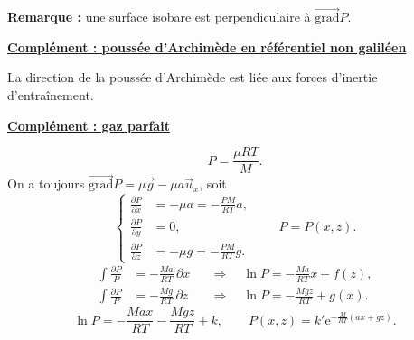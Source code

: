 \documentclass[11pt,a4paper]{article}
\newcommand{\grad}{\overrightarrow{\mathrm{grad}}}
\newcommand{\pd}[2]{\frac{\partial #1}{\partial #2}}
\newcommand{\ux}{\vec u_x}\newcommand{\uy}{\vec u_y}\newcommand{\uz}{\vec u_z}
\newcommand{\titr}[1]{\par\needspace{4\baselineskip}\textbf{\underline{#1}}\par}
\begin{document}
\textbf{Remarque :} une surface isobare est perpendiculaire à $\grad P$.
\titr{Complément : poussée d'Archimède en référentiel non galiléen}
\begin{minipage}{.35\linewidth}\centering{}\end{minipage}\hfill\begin{minipage}{.62\linewidth}
La direction de la poussée d'Archimède est liée aux forces d'inertie d'entraînement.
\end{minipage}
\titr{Complément : gaz parfait}
\[P=\frac{\mu RT}{M}.\]
On a toujours $\grad P=\mu\vec g-\mu a\ux$, soit
\[\left\{\begin{aligned}
\pd P x&=-\mu a=-\frac{PM}{RT}a,\\
\pd P y&=0,\\
\pd P z&=-\mu g=-\frac{PM}{RT}g.
\end{aligned}\right.\qquad P=P(x,z).\]
\[\begin{aligned}
\int\frac{\partial P}{P}&=-\frac{Ma}{RT}\,\partial x
&&\Longrightarrow\quad\ln P=-\frac{Ma}{RT}x+f(z),\\
\int\frac{\partial P}{P}&=-\frac{Mg}{RT}\,\partial z
&&\Longrightarrow\quad\ln P=-\frac{Mgz}{RT}+g(x).
\end{aligned}\]
\[\ln P=-\frac{Max}{RT}-\frac{Mgz}{RT}+k,\qquad
P(x,z)=k'\mathrm e^{-\frac{M}{RT}(ax+gz)}.\]
\end{document}
